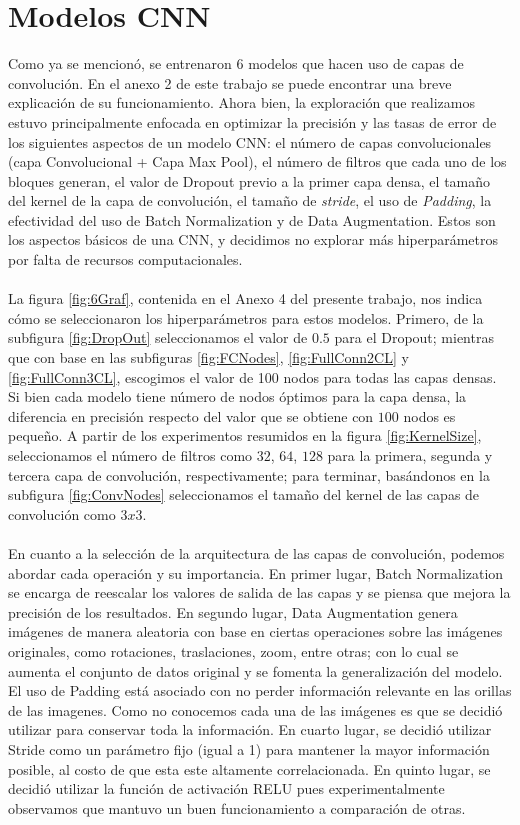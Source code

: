 \documentclass[11pt]{article}
\begin{document}
\section{Modelos CNN}
Como ya se mencionó, se entrenaron 6 modelos que hacen uso de capas de convolución. En el anexo 2 de este trabajo se puede encontrar una breve explicación de su funcionamiento. Ahora bien, la exploración que realizamos estuvo principalmente enfocada en optimizar la precisión y las tasas de error de los siguientes aspectos de un modelo CNN: el número de capas convolucionales (capa Convolucional + Capa Max Pool), el número de filtros que cada uno de los bloques generan, el valor de Dropout previo a la primer capa densa, el tamaño del kernel de la capa de convolución, el tamaño de \textit{stride}, el uso de \textit{Padding}, la efectividad del uso de Batch Normalization y de Data Augmentation. Estos son los aspectos básicos de una CNN,  y decidimos no explorar más hiperparámetros por falta de recursos computacionales. 
\\
\\
La figura \ref{fig:6Graf}, contenida en el Anexo 4 del presente trabajo, nos indica cómo se seleccionaron los hiperparámetros para estos modelos. Primero, de la subfigura \ref{fig:DropOut} seleccionamos el valor de $0.5$ para el Dropout; mientras que con base en las subfiguras \ref{fig:FCNodes}, \ref{fig:FullConn2CL} y \ref{fig:FullConn3CL}, escogimos el valor de 100 nodos para todas las capas densas. Si bien cada modelo tiene número de nodos óptimos para la capa densa, la diferencia en precisión respecto del valor que se obtiene con $100$ nodos es pequeño. A partir de los experimentos resumidos en la figura \ref{fig:KernelSize}, seleccionamos el número de filtros como $32$, $64$, $128$ para la primera, segunda y tercera capa de convolución, respectivamente; para terminar, basándonos en la subfigura \ref{fig:ConvNodes} seleccionamos el tamaño del kernel de las capas de convolución como $3x3$.
\\
\\
En cuanto a la selección de la arquitectura de las capas de convolución, podemos abordar cada operación y su importancia. En primer lugar, Batch Normalization se encarga de reescalar los valores de salida de las capas y se piensa que mejora la precisión de los resultados. En segundo lugar, Data Augmentation genera imágenes de manera aleatoria con base en ciertas operaciones sobre las imágenes originales, como rotaciones, traslaciones, zoom, entre otras; con lo cual se aumenta el conjunto de datos original y se fomenta la generalización del modelo. El uso de Padding está asociado con no perder información relevante en las orillas de las imagenes. Como no conocemos cada una de las imágenes es que se decidió utilizar para conservar toda la información. En cuarto lugar, se decidió utilizar Stride como un parámetro fijo (igual a 1) para mantener la mayor información posible, al costo de que esta este altamente correlacionada. En quinto lugar, se decidió utilizar la función de activación RELU pues experimentalmente observamos que mantuvo un buen funcionamiento a comparación de otras. 
\end{document}
